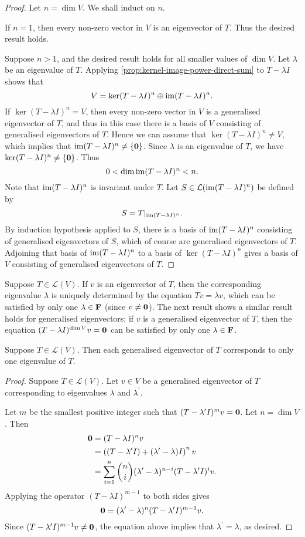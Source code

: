 \begin{proof}
Let $n=\dim V$. We shall induct on $n$.

If $n=1$, then every non-zero vector in $V$ is an eigenvector of $T$. Thus the desired result holds.

Suppose $n>1$, and the desired result holds for all smaller values of $\dim V$. 
Let $\lambda$ be an eigenvalue of $T$.
Applying \ref{prop:kernel-image-power-direct-sum} to $T-\lambda I$ shows that
\[V=\ker(T-\lambda I)^n\oplus\operatorname{im}(T-\lambda I)^n.\]
If $\ker(T-\lambda I)^n=V$, then every non-zero vector in $V$ is a generalised eigenvector of $T$, and thus in this case there is a basis of $V$ consisting of generalised eigenvectors of $T$. Hence we can assume that $\ker(T-\lambda I)^n\neq V$, which implies that $\operatorname{im}(T-\lambda I)^n\neq\{\vb{0}\}$.
Since $\lambda$ is an eigenvalue of $T$, we have $\ker(T-\lambda I)^n\neq\{\vb{0}\}$. Thus
\[0<\dim\operatorname{im}(T-\lambda I)^n<n.\]
Note that $\operatorname{im}(T-\lambda I)^n$ is invariant under $T$. Let $S\in\mathcal{L}(\operatorname{im}(T-\lambda I)^n)$ be defined by
\[S=T|_{\operatorname{im}(T-\lambda I)^n}.\]
By induction hypothesis applied to $S$, there is a basis of $\operatorname{im}(T-\lambda I)^n$ consisting of generalised eigenvectors of $S$, which of course are generalised eigenvectors of $T$. Adjoining that basis of $\operatorname{im}(T-\lambda I)^n$ to a basis of $\ker(T-\lambda I)^n$ gives a basis of $V$ consisting of generalised eigenvectors of $T$.
\end{proof}

Suppose $T\in\mathcal{L}(V)$. If $v$ is an eigenvector of $T$, then the corresponding eigenvalue $\lambda$ is uniquely determined by the equation $Tv=\lambda v$, which can be satisfied by only one $\lambda\in\mathbf F$ (since $v\neq\vb{0}$). 
The next result shows a similar result holds for generalised eigenvectors: if $v$ is a generalised eigenvector of $T$, then the equation $(T-\lambda I)^{\dim V}v=\vb{0}$ can be satisfied by only one $\lambda\in\mathbf F$.

\begin{lemma}
Suppose $T\in\mathcal{L}(V)$. Then each generalised eigenvector of $T$ corresponds to only one eigenvalue of $T$.
\end{lemma}

\begin{proof}
Suppose $T\in\mathcal{L}(V)$. Let $v\in V$ be a generalised eigenvector of $T$ corresponding to eigenvalues $\lambda$ and $\lambda^\prime$. 

Let $m$ be the smallest positive integer such that $(T-\lambda^\prime I)^m v=\vb{0}$. 
Let $n=\dim V$. 
Then
\begin{align*}
\vb{0}&=(T-\lambda I)^n v\\
&=\left((T-\lambda^\prime I)+(\lambda^\prime-\lambda)I\right)^n v\\
&=\sum_{i=1}^{n}\binom{n}{i}(\lambda^\prime-\lambda)^{n-i}(T-\lambda^\prime I)^i v.
\end{align*}
Applying the operator $(T-\lambda I)^{m-1}$ to both sides gives
\[\vb{0}=(\lambda^\prime-\lambda)^n(T-\lambda^\prime I)^{m-1}v.\]
Since $(T-\lambda^\prime I)^{m-1}v\neq\vb{0}$, the equation above implies that $\lambda^\prime=\lambda$, as desired.
\end{proof}

